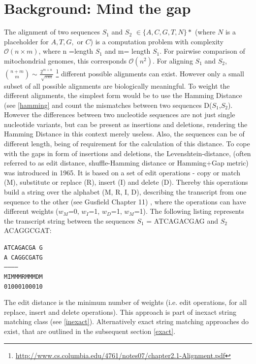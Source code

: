 \section{Background: Mind the gap}
The alignment of two sequences $S_1$ and $S_2$ $\in \{A,C,G,T,N\}*$ (where $N$ is a placeholder for $A, T, G,$ or $C$) is a computation problem with complexity $\mathcal{O}(n \times m)$, where n =length $S_1$ and m= length $S_1$. For pairwise comparison of mitochondrial genomes, this corresponds $\mathcal{O}({n}^{2})$. For aligning $S_1$ and $S_2$, ${{n+m}\choose{m}} \sim \frac{ {2}^{m  + n}}{\sqrt[]{\pi m}}$   \footnote{\url{http://www.cs.columbia.edu/4761/notes07/chapter2.1-Alignment.pdf}} different possible alignments can exist. However only a small subset of all possible alignments are biologically meaningful. To weight the different alignments, the simplest form would be to use the Hamming Distance (see \ref{hamming} and count the mismatches between two sequences D($S_1$,$S_2$). However the differences between two nucleotide sequences are not just single nucleotide variants, but can be present as insertions and deletions, rendering the Hamming Distance in this context merely useless. Also, the sequences can be of different length, being of requirement for the calculation of this distance. To cope with the gaps in form of insertions and deletions, the Levenshtein-distance, (often referred to as edit distance, shuffle-Hamming distance or Hamming+Gap metric) \cite{Deza2009} was introduced in 1965. It is based on a set of edit operations - copy or match (M), substitute or replace (R), insert (I) and delete (D). Thereby this operations build a string over the alphabet (M, R, I, D), describing the transcript from one sequence to the other (see Gusfield Chapter 11) \cite{Gusfield1997}, where the operations can have different weights ($w_M$=0, $w_I$=1, $w_D$=1, $w_M$=1). The following listing represents the transcript string between the sequences $S_1$ = ATCAGACGAG and $S_2$ ACAGGCGAT:
\begin{center}
\texttt{ATCAGACGA G} \\
\texttt{A CAGGCGATG} \\
\texttt{-----------} \\
\texttt{MIMMMRMMMDM} \\
\texttt{01000100010} \\
\end{center}
The edit distance is the minimum number of weights (i.e. edit operations, for all replace, insert and delete operations). This approach is part of inexact string matching class (see \ref{inexact}). Alternatively exact string matching approaches do exist, that are outlined in the subsequent section \ref{exact}. 

